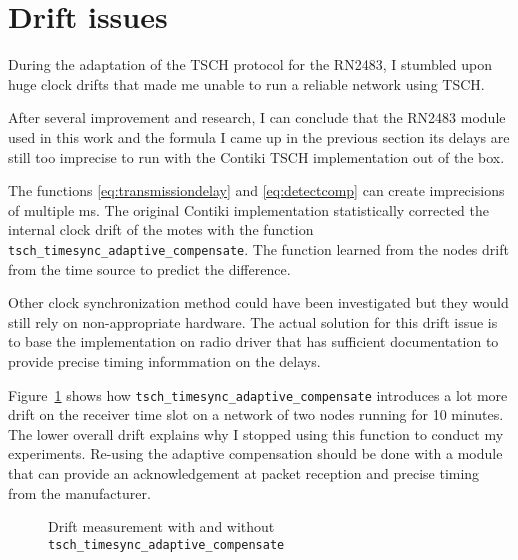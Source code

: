 
\section{Drift issues\label{section:driftissues}}

During the adaptation of the TSCH protocol for the RN2483, I stumbled upon huge
clock drifts that made me unable to run a reliable network using TSCH.

After several improvement and research, I can conclude that the RN2483
module used in this work and the formula I came up in the previous section its
delays are still too imprecise to run with the Contiki TSCH
implementation out of the box.

The functions \ref{eq:transmissiondelay} and \ref{eq:detectcomp} can
create imprecisions of multiple ms.
The original Contiki implementation statistically corrected the internal clock
drift of the motes with the function
\lstinline{tsch_timesync_adaptive_compensate}.
The function learned from the nodes drift from the time source to predict the
difference.

Other clock synchronization method could have been investigated but they would
still rely on non-appropriate hardware.
The actual solution for this drift issue is to base the implementation on radio
driver that has sufficient documentation to provide precise timing informmation
on the delays.

Figure~\ref{fig:driftmeasurement} shows how
\lstinline{tsch_timesync_adaptive_compensate} introduces a lot more drift on the
receiver time slot on a network of two nodes running for 10 minutes.
The lower overall drift explains why I stopped using this function to conduct my experiments.
Re-using the adaptive compensation should be done with a module that can
provide an acknowledgement at packet reception and precise timing from the
manufacturer.

\begin{figure}[H]
  \centering
  \caption{Drift measurement with and without \lstinline{tsch_timesync_adaptive_compensate}\label{fig:driftmeasurement}}
\end{figure}

